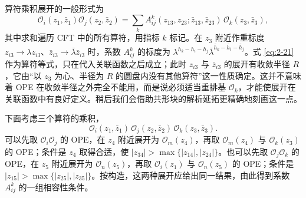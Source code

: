 算符乘积展开的一般形式为
\begin{equation}
  \label{eq:2-21}
  \mathcal{O}_i(z_1,\bar z_1)\mathcal{O}_j(z_2,\bar z_2)
  = \sum_k A_{ij}^{k}(z_{13},z_{23};\bar z_{13},\bar z_{23})\,\mathcal{O}_k(z_3,\bar z_3),
\end{equation}
其中求和遍历 CFT 中的所有算符，用指标 $k$ 标记。在 $z_3$ 附近作重标度 $z_{i3}\to\lambda z_{i3}$、$\bar z_{i3}\to\bar\lambda\bar z_{i3}$ 时，系数 $A_{ij}^{k}$ 的标度为 $\lambda^{h_k-h_i-h_j}\bar\lambda^{\bar h_k-\bar h_i-\bar h_j}$。式 \eqref{eq:2-21} 作为算符等式，只在代入关联函数之后成立；此时 $z_{i3}$ 与 $\bar z_{i3}$ 的展开有收敛半径 $R$，它由“以 $z_3$ 为心、半径为 $R$ 的圆盘内没有其他算符”这一性质确定。这并不意味着 OPE 在收敛半径之外完全不能用，而是说必须适当重排基 $\mathcal{O}_k$，才能使展开在关联函数中有良好定义。稍后我们会借助共形块的解析延拓更精确地刻画这一点。

下面考虑三个算符的乘积，
\begin{equation}
  \label{eq:2-22}
  \mathcal{O}_i(z_1,\bar z_1)\,\mathcal{O}_j(z_2,\bar z_2)\,\mathcal{O}_k(z_3,\bar z_3).
\end{equation}
可以先取 $\mathcal{O}_i\mathcal{O}_j$ 的 OPE，在 $z_4$ 附近展开为 $\mathcal{O}_m(z_4)$，再取 $\mathcal{O}_m(z_4)$ 与 $\mathcal{O}_k(z_3)$ 的 OPE；条件是 $z_4$ 取得合适，使 $|z_{34}|>\max\{|z_{14}|,|z_{24}|\}$。也可以先取 $\mathcal{O}_j\mathcal{O}_k$ 的 OPE，在 $z_5$ 附近展开为 $\mathcal{O}_n(z_5)$，再取 $\mathcal{O}_i(z_1)$ 与 $\mathcal{O}_n(z_5)$ 的 OPE；条件是 $|z_{15}|>\max\{|z_{25}|,|z_{35}|\}$。按构造，这两种展开应给出同一结果，由此得到系数 $A_{ij}^{k}$ 的一组相容性条件。

